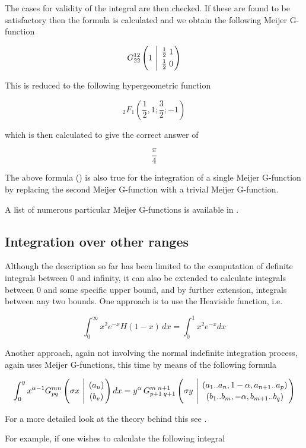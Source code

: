 The cases for validity of the integral are then checked. If these
are found to be satisfactory then the formula is calculated and we
obtain the following Meijer G-function

\[
G^{1 2}_{2 2} \left(1 \ \Bigg\vert \ \MeijerGparams{\frac{1}{2} \; 1}{\frac{1}{2} \; 0} \right)
\]

This is reduced to the following hypergeometric function

\[
_2F_1 (\frac{1}{2},1;\frac{3}{2};-1)
\]

which is then calculated to give the correct answer of

\[
\frac{\pi}{4}
\]

The above formula () is also true for the
integration of a single Meijer G-function by replacing the second
Meijer G-function with a trivial Meijer G-function.

A list of numerous particular Meijer G-functions is available in
\cite {Prudnikov:90c}.

\subsection{Integration over other ranges}

Although the description so far has been limited to the computation of
definite integrals between 0 and infinity, it can also be extended to
calculate integrals between 0 and some specific upper bound, and
by further extension, integrals between any two bounds.  One approach is
to use the Heaviside function, i.e.

\[
\int_{0}^{\infty} x^{2} e^{-x} H(1-x)\,dx = \int_{0}^{1} x^{2} e^{-x}dx
\]

Another approach, again not involving the normal indefinite integration
process, again uses Meijer G-functions, this time by means of the
following formula

\begin{equation}
\int_{0}^{y} x^{\alpha-1} G^{m n}_{p q}
\left( \sigma x \  \Bigg\vert \ \MeijerGparams{(a_u)}{(b_v)} \right) dx=%
y^{\alpha}\,G^{m \; n+1}_{p+1 \; q+1} \left( \sigma y \  \Bigg\vert \
\MeijerGparams{( a_1..a_n,1-\alpha,a_{n+1}..a_p)}{(b_1..b_m,-\alpha,b_{m+1}..b_q)} \right) \label{defint:eq2}
\end{equation}

For a more detailed look at the theory behind this see
\cite{Adamchik90}.

For example, if one wishes to calculate the following integral

